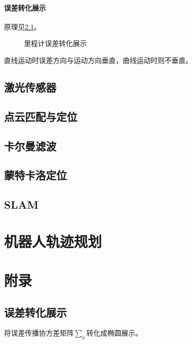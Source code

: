 \documentclass[
12pt, %
a4paper, 
oneside, %
headinclude,footinclude, %
]{scrartcl}
\begin{document}
\paragraph{误差转化展示}
原理见\ref{sec:error}。

\begin{figure}[H]
\centering
{} \quad
{}
\caption{里程计误差转化展示}
\end{figure}

直线运动时误差方向与运动方向垂直，曲线运动时则不垂直。
\subsection[激光传感器]{激光传感器}
\subsection[点云匹配与定位]{点云匹配与定位}
\subsection[卡尔曼滤波]{卡尔曼滤波}
\subsection[蒙特卡洛定位]{蒙特卡洛定位}
\subsection[SLAM]{SLAM}
\section{机器人轨迹规划}
\section{附录}
\subsection[误差转化展示]{误差转化展示}\label{sec:error}
将误差传播协方差矩阵$ \sum_p $转化成椭圆展示。
\end{document}
